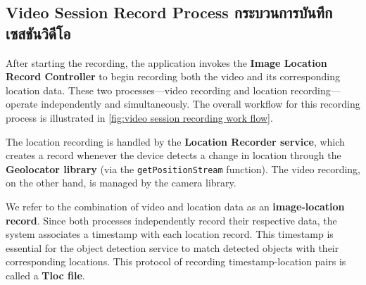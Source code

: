 \subsection{\ifenglish Video Session Record Process \else กระบวนการบันทึกเซสชันวิดีโอ \fi}
After starting the recording, the application invokes the \textbf{Image Location Record Controller} to begin recording both the video and its corresponding location data. These two processes—video recording and location recording—operate independently and simultaneously. The overall workflow for this recording process is illustrated in \autoref{fig:video session recording work flow}. 

The location recording is handled by the \textbf{Location Recorder service}, which creates a record whenever the device detects a change in location through the \textbf{Geolocator library} (via the \texttt{getPositionStream} function). The video recording, on the other hand, is managed by the camera library.

We refer to the combination of video and location data as an \textbf{image-location record}. Since both processes independently record their respective data, the system associates a timestamp with each location record. This timestamp is essential for the object detection service to match detected objects with their corresponding locations. This protocol of recording timestamp-location pairs is called a \textbf{Tloc file}.

